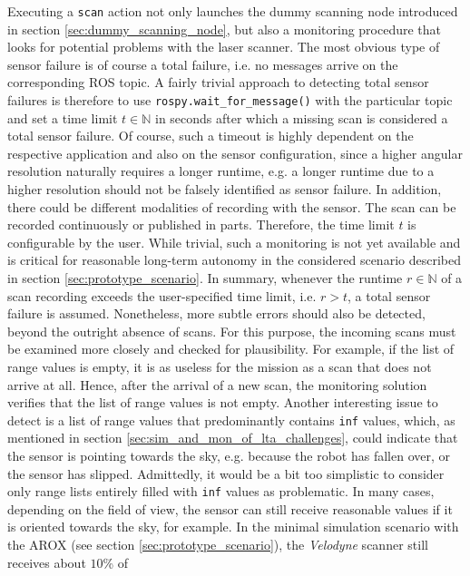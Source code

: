 \documentclass[english, master, utf8]{base/thesis_KBS}
\newcommand{\code}[1]{\colorbox{light-gray}{\texttt{#1}}}
\begin{document}
\noindent
Executing a \code{scan} action not only launches the dummy scanning node introduced in section \ref{sec:dummy_scanning_node}, but also a monitoring procedure that
looks for potential problems with the laser scanner. The most obvious type of sensor failure is of course a total failure, i.e. no messages arrive on the corresponding ROS topic.
A fairly trivial approach to detecting total sensor failures is therefore to use \code{rospy.wait\_for\_message()} with the particular topic and set a time limit $t \in \mathbb{N}$
in seconds after which a missing scan is considered a total sensor failure. Of course, such a timeout is highly dependent on the respective application and also on the sensor 
configuration, since a higher angular resolution naturally requires a longer runtime, e.g. a longer runtime due to a higher resolution should not be falsely identified 
as sensor failure. In addition, there could be different modalities of recording with the sensor. The scan can be recorded continuously or published in parts.
Therefore, the time limit $t$ is configurable by the user. While trivial, such a monitoring is not yet available and is critical for reasonable long-term autonomy in the 
considered scenario described in section \ref{sec:prototype_scenario}. In summary, whenever the runtime $r \in \mathbb{N}$ of a scan recording exceeds the user-specified time
limit, i.e. $r > t$, a total sensor failure is assumed. Nonetheless, more subtle errors should also be detected, beyond the outright absence of scans.
For this purpose, the incoming scans must be examined more closely and checked for plausibility. For example, if the list of range values is empty, it is as useless for
the mission as a scan that does not arrive at all. Hence, after the arrival of a new scan, the monitoring solution verifies that the list of range values is not empty.
Another interesting issue to detect is a list of range values that predominantly contains \code{inf} values, which, as mentioned in section
\ref{sec:sim_and_mon_of_lta_challenges}, could indicate that the sensor is pointing towards the sky, e.g. because the robot has fallen over,
or the sensor has slipped. Admittedly, it would be a bit too simplistic to consider only range lists entirely filled with \code{inf} values as problematic.
In many cases, depending on the field of view, the sensor can still receive reasonable values if it is oriented towards the sky, for example.
In the minimal simulation scenario with the AROX (see section \ref{sec:prototype_scenario}), the \textit{Velodyne} scanner still receives about $10$\% of 
\end{document}
